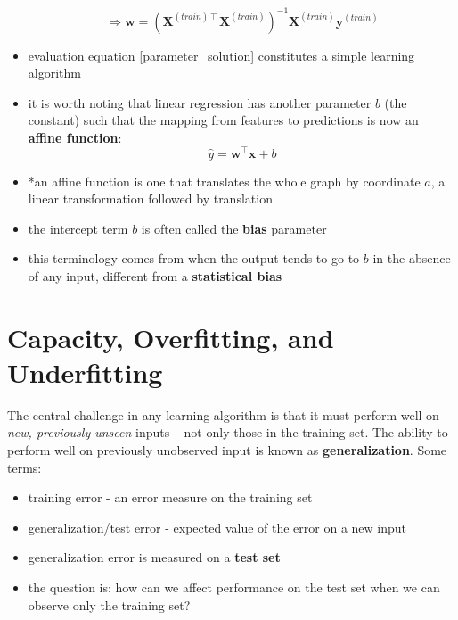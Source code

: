 \documentclass[11pt, twocolumn]{report}
\begin{document}
\begin{itemize}
\begin{equation}
      \label{parameter_solution}
      \Rightarrow \bm{w} = \left(\bm{X}^{(train)\intercal}
        \bm{X}^{(train)}\right)^{-1} \bm{X}^{(train)} \bm{y}^{(train)}
    \end{equation}
  \item evaluation equation \ref{parameter_solution} constitutes a simple
    learning algorithm
  \item it is worth noting that linear regression has another parameter $b$
    (the constant) such that the mapping from features to predictions is now an
    \textbf{affine function}:
    \begin{equation}
      \hat{y} = \bm{w}^\intercal\bm{x} + b
    \end{equation}
  \item *an affine function is one that translates the whole graph by
    coordinate $a$, a linear transformation followed by translation
  \item the intercept term $b$ is often called the \textbf{bias} parameter
  \item this terminology comes from when the output tends to go to $b$ in the
    absence of any input, different from a \textbf{statistical bias}
\end{itemize}

\section{Capacity, Overfitting, and Underfitting}
The central challenge in any learning algorithm is that it must perform well on
\textit{new, previously unseen} inputs -- not only those in the training set.
The ability to perform well on previously unobserved input is known as
\textbf{generalization}.
Some terms:
\begin{itemize}
  \item training error - an error measure on the training set
  \item generalization/test error - expected value of the error on a new input
  \item generalization error is measured on a \textbf{test set}
  \item the question is: how can we affect performance on the test set when we
    can observe only the training set?
\end{itemize}
\end{document}
